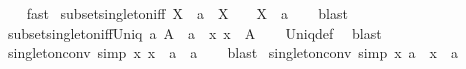 \begin{isabellebody}
%
\isadelimproof
\ \ %
\endisadelimproof
%
\isatagproof
{}\isamarkupfalse%
\ fast%
\endisatagproof
{\isafoldproof}%
%
\isadelimproof
\isanewline
%
\endisadelimproof
\isanewline
{}\isamarkupfalse%
\ subset{\isacharunderscore}{\kern0pt}singleton{\isacharunderscore}{\kern0pt}iff{\isacharcolon}{\kern0pt}\ {\isachardoublequoteopen}X\ {\isasymsubseteq}\ {\isacharbraceleft}{\kern0pt}a{\isacharbraceright}{\kern0pt}\ {\isasymlongleftrightarrow}\ X\ {\isacharequal}{\kern0pt}\ {\isacharbraceleft}{\kern0pt}{\isacharbraceright}{\kern0pt}\ {\isasymor}\ X\ {\isacharequal}{\kern0pt}\ {\isacharbraceleft}{\kern0pt}a{\isacharbraceright}{\kern0pt}{\isachardoublequoteclose}\isanewline
%
\isadelimproof
\ \ %
\endisadelimproof
%
\isatagproof
{}\isamarkupfalse%
\ blast%
\endisatagproof
{\isafoldproof}%
%
\isadelimproof
\isanewline
%
\endisadelimproof
\isanewline
{}\isamarkupfalse%
\ subset{\isacharunderscore}{\kern0pt}singleton{\isacharunderscore}{\kern0pt}iff{\isacharunderscore}{\kern0pt}Uniq{\isacharcolon}{\kern0pt}\ {\isachardoublequoteopen}{\isacharparenleft}{\kern0pt}{\isasymexists}a{\isachardot}{\kern0pt}\ A\ {\isasymsubseteq}\ {\isacharbraceleft}{\kern0pt}a{\isacharbraceright}{\kern0pt}{\isacharparenright}{\kern0pt}\ {\isasymlongleftrightarrow}\ {\isacharparenleft}{\kern0pt}{\isasymexists}\isactrlsub {\isasymle}x{\isachardot}{\kern0pt}\ x\ {\isasymin}\ A{\isacharparenright}{\kern0pt}{\isachardoublequoteclose}\isanewline
%
\isadelimproof
\ \ %
\endisadelimproof
%
\isatagproof
{}\isamarkupfalse%
\ Uniq{\isacharunderscore}{\kern0pt}def\ \isamarkupfalse%
\ blast%
\endisatagproof
{\isafoldproof}%
%
\isadelimproof
\isanewline
%
\endisadelimproof
\isanewline
{}\isamarkupfalse%
\ singleton{\isacharunderscore}{\kern0pt}conv\ {\isacharbrackleft}{\kern0pt}simp{\isacharbrackright}{\kern0pt}{\isacharcolon}{\kern0pt}\ {\isachardoublequoteopen}{\isacharbraceleft}{\kern0pt}x{\isachardot}{\kern0pt}\ x\ {\isacharequal}{\kern0pt}\ a{\isacharbraceright}{\kern0pt}\ {\isacharequal}{\kern0pt}\ {\isacharbraceleft}{\kern0pt}a{\isacharbraceright}{\kern0pt}{\isachardoublequoteclose}\isanewline
%
\isadelimproof
\ \ %
\endisadelimproof
%
\isatagproof
{}\isamarkupfalse%
\ blast%
\endisatagproof
{\isafoldproof}%
%
\isadelimproof
\isanewline
%
\endisadelimproof
\isanewline
{}\isamarkupfalse%
\ singleton{\isacharunderscore}{\kern0pt}conv{}\ {\isacharbrackleft}{\kern0pt}simp{\isacharbrackright}{\kern0pt}{\isacharcolon}{\kern0pt}\ {\isachardoublequoteopen}{\isacharbraceleft}{\kern0pt}x{\isachardot}{\kern0pt}\ a\ {\isacharequal}{\kern0pt}\ x{\isacharbraceright}{\kern0pt}\ {\isacharequal}{\kern0pt}\ {\isacharbraceleft}{\kern0pt}a{\isacharbraceright}{\kern0pt}{\isachardoublequoteclose}\isanewline

\end{isabellebody}
